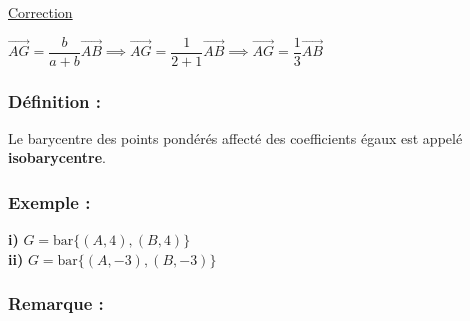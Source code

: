 \documentclass{article}
\begin{document}
\vspace{1.5em}

\begin{center}
    \underline{\color{red}Correction}
\end{center}

\noindent $\overrightarrow{AG} = \dfrac{b}{a + b} \overrightarrow{AB} \implies \overrightarrow{AG} = \dfrac{1}{2 + 1} \overrightarrow{AB} \implies \overrightarrow{AG} = \dfrac{1}{3} \overrightarrow{AB}$

\vspace{2em}

\begin{center}
\end{center}

\subsubsection*{Définition :}

Le barycentre des points pondérés affecté des coefficients égaux est appelé \textbf{isobarycentre}.

\vspace{1em}

\subsubsection*{Exemple :}

\noindent \textbf{i)} $G = \text{bar} \{(A, 4), (B, 4)\}$ \\
\textbf{ii)} $G = \text{bar} \{(A, -3), (B, -3)\}$

\vspace{1em}

\subsubsection*{Remarque :}
\end{document}
